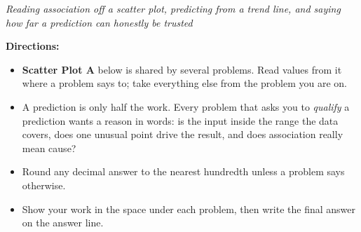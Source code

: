 \documentclass[12pt]{article}
\begin{document}

\begin{center}\small\textit{Reading association off a scatter plot, predicting from a
trend line, and saying how far a prediction can honestly be trusted}\end{center}

\noindent\small\textbf{Directions:}
\begin{itemize}[label={$\bullet$}, leftmargin=1.1cm, itemsep=1pt, topsep=2pt]
  \item \textbf{Scatter Plot A} below is shared by several problems. Read values from it
        where a problem says to; take everything else from the problem you are on.
  \item A prediction is only half the work. Every problem that asks you to \emph{qualify}
        a prediction wants a reason in words: is the input inside the range the data
        covers, does one unusual point drive the result, and does association really mean
        cause?
  \item Round any decimal answer to the nearest hundredth unless a problem says otherwise.
  \item Show your work in the space under each problem, then write the final answer on the
        answer line.
\end{itemize}
\normalsize
\end{document}
